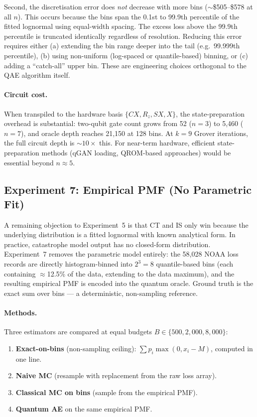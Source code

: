 \documentclass[11pt,a4paper]{article}
\begin{document}
Second, the discretisation error does \emph{not} decrease with more bins ($\sim$\$505--\$578 at all $n$). This occurs because the bins span the 0.1st to 99.9th percentile of the fitted lognormal using equal-width spacing. The excess loss above the 99.9th percentile is truncated identically regardless of resolution. Reducing this error requires either (a) extending the bin range deeper into the tail (e.g.\ 99.999th percentile), (b) using non-uniform (log-spaced or quantile-based) binning, or (c) adding a ``catch-all'' upper bin. These are engineering choices orthogonal to the QAE algorithm itself.

\paragraph{Circuit cost.} When transpiled to the hardware basis $\{CX, R_z, SX, X\}$, the state-preparation overhead is substantial: two-qubit gate count grows from 52 ($n = 3$) to 5{,}460 ($n = 7$), and oracle depth reaches 21{,}150 at 128 bins. At $k = 9$ Grover iterations, the full circuit depth is $\sim$$10\times$ this. For near-term hardware, efficient state-preparation methods (qGAN loading, QROM-based approaches) would be essential beyond $n \approx 5$.


\subsection{Experiment 7: Empirical PMF (No Parametric Fit)}

A remaining objection to Experiment~5 is that CT and IS only win because the underlying distribution is a fitted lognormal with known analytical form. In practice, catastrophe model output has no closed-form distribution. Experiment~7 removes the parametric model entirely: the 58{,}028 NOAA loss records are directly histogram-binned into $2^3 = 8$ quantile-based bins (each containing $\approx$12.5\% of the data, extending to the data maximum), and the resulting empirical PMF is encoded into the quantum oracle. Ground truth is the exact sum over bins --- a deterministic, non-sampling reference.

\paragraph{Methods.} Three estimators are compared at equal budgets $B \in \{500, 2{,}000, 8{,}000\}$:
\begin{enumerate}[nosep]
  \item \textbf{Exact-on-bins} (non-sampling ceiling): $\sum p_i \max(0, x_i - M)$, computed in one line.
  \item \textbf{Naive MC} (resample with replacement from the raw loss array).
  \item \textbf{Classical MC on bins} (sample from the empirical PMF).
  \item \textbf{Quantum AE} on the same empirical PMF.
\end{enumerate}
\end{document}
